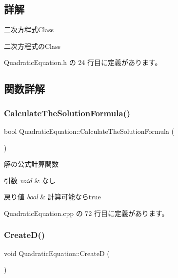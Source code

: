 \subsection{詳解}
二次方程式\+Class 

二次方程式の\+Class 

 Quadratic\+Equation.\+h の 24 行目に定義があります。



\subsection{関数詳解}
\mbox{\label{class_quadratic_equation_a624a3c6bb7b1cb741cba0b715075e2ed}} 
\subsubsection{\texorpdfstring{Calculate\+The\+Solution\+Formula()}{CalculateTheSolutionFormula()}}
{\footnotesize\ttfamily bool Quadratic\+Equation\+::\+Calculate\+The\+Solution\+Formula (\begin{DoxyParamCaption}{ }\end{DoxyParamCaption})}



解の公式計算関数 


\begin{DoxyParams}{引数}
{\em void} & なし \\
\hline
\end{DoxyParams}

\begin{DoxyRetVals}{戻り値}
{\em bool} & 計算可能ならtrue \\
\hline
\end{DoxyRetVals}


 Quadratic\+Equation.\+cpp の 72 行目に定義があります。

\mbox{\label{class_quadratic_equation_a52f73bed0b665bcf3ab827630b999762}} 
\subsubsection{\texorpdfstring{Create\+D()}{CreateD()}}
{\footnotesize\ttfamily void Quadratic\+Equation\+::\+CreateD (\begin{DoxyParamCaption}{ }\end{DoxyParamCaption})}



